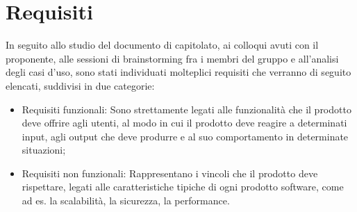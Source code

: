 \section{Requisiti}
In seguito allo studio del documento di capitolato, ai colloqui avuti con il proponente, alle sessioni di
brainstorming fra i membri del gruppo e all'analisi degli casi d'uso, sono stati individuati molteplici requisiti
che verranno di seguito elencati, suddivisi in due categorie:
\begin{itemize}
    \item Requisiti funzionali: Sono strettamente legati alle funzionalità che il prodotto deve offrire agli utenti, al modo in cui il prodotto deve reagire a determinati input, agli output che deve produrre e al suo comportamento in determinate situazioni;
    \item Requisiti non funzionali: Rappresentano i vincoli che il prodotto deve rispettare, legati alle caratteristiche tipiche di ogni prodotto software, come ad es. la scalabilità, la sicurezza, la performance.
\end{itemize}
